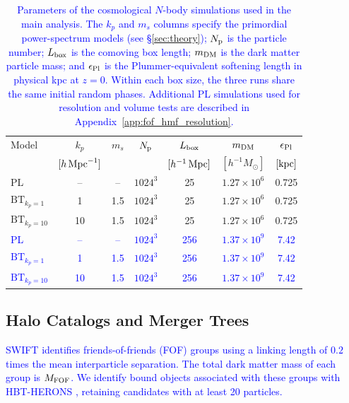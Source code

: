 \documentclass[
 reprint,
 superscriptaddress,
 nofootinbib,
 nobibnotes,
 amsmath,
 amssymb,
 aps,
 prd,
 floatfix,
 longbibliography
]{revtex4-2}
\DeclareRobustCommand{\change}[1]{\textcolor{blue}{#1}}
\DeclareRobustCommand{\BTKPone}{\ensuremath{\mathrm{BT}_{k_p=1}}}
\DeclareRobustCommand{\BTKPten}{\ensuremath{\mathrm{BT}_{k_p=10}}}
\begin{document}
\begin{table}[t]
\caption{\change{Parameters of the cosmological \(N\)-body simulations used in the main analysis. The \(k_p\) and \(m_s\) columns specify the primordial power-spectrum models (see \S\ref{sec:theory}); \(N_{\rm p}\) is the particle number; \(L_{\rm box}\) is the comoving box length; \(m_{\rm DM}\) is the dark matter particle mass; and \(\epsilon_{\rm Pl}\) is the Plummer-equivalent softening length in physical kpc at \(z=0\). Within each box size, the three runs share the same initial random phases. Additional PL simulations used for resolution and volume tests are described in Appendix~\ref{app:fof_hmf_resolution}.}}
\label{tab:simulation_parameters}
\label{tab:Params_all_models}
\centering
\begin{ruledtabular}
\begin{tabular}{lcccccc}
Model & \(k_p\) & \(m_s\) & \(N_{\rm p}\) & \(L_{\rm box}\) & \(m_{\rm DM}\) & \(\epsilon_{\rm Pl}\) \\
 & \([h\,{\rm Mpc}^{-1}]\) & & & \([h^{-1}\,{\rm Mpc}]\) & \([h^{-1}M_\odot]\) & \([{\rm kpc}]\) \\
\colrule
PL & -- & -- & \(1024^3\) & 25 & \(1.27\times 10^6\) & 0.725 \\
\BTKPone{} & 1 & 1.5 & \(1024^3\) & 25 & \(1.27\times 10^6\) & 0.725 \\
\BTKPten{} & 10 & 1.5 & \(1024^3\) & 25 & \(1.27\times 10^6\) & 0.725 \\
\colrule
\change{PL} & \change{--} & \change{--} & \change{\(1024^3\)} & \change{256} & \change{\(1.37\times 10^9\)} & \change{7.42} \\
\change{\BTKPone{}} & \change{1} & \change{1.5} & \change{\(1024^3\)} & \change{256} & \change{\(1.37\times 10^9\)} & \change{7.42} \\
\change{\BTKPten{}} & \change{10} & \change{1.5} & \change{\(1024^3\)} & \change{256} & \change{\(1.37\times 10^9\)} & \change{7.42} \\
\end{tabular}
\end{ruledtabular}
\end{table}


\subsection{Halo Catalogs and Merger Trees}
\label{subsec:halo_catalogs}

\change{\textsc{SWIFT} identifies friends-of-friends (FOF) groups \citep{Davis1985FOF} using a linking length of \(0.2\) times the mean interparticle separation. The total dark matter mass of each group is \(M_{\rm FOF}\). We identify bound objects associated with these groups with \textsc{HBT-HERONS} \citep{Victor25HBTHERONS}, retaining candidates with at least 20 particles.}
\end{document}
